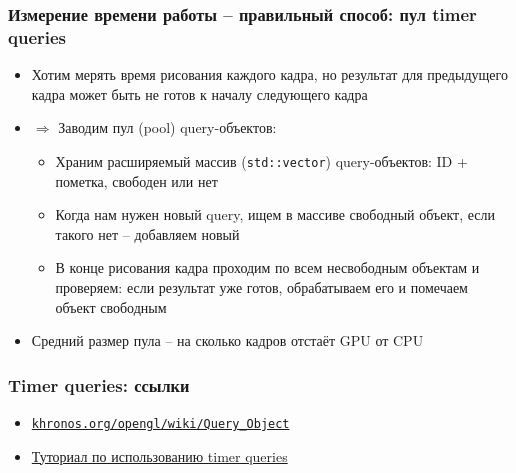 \documentclass{beamer}
\begin{document}
\begin{frame}[fragile]
\frametitle{Измерение времени работы -- правильный способ: пул timer queries}
\begin{itemize}
\item Хотим мерять время рисования каждого кадра, но результат для предыдущего кадра может быть не готов к началу следующего кадра
\pause
\item \begin{math}\Rightarrow\end{math} Заводим пул (pool) query-объектов:
\pause
\begin{itemize}
\item Храним расширяемый массив (\verb|std::vector|) query-объектов: ID + пометка, свободен или нет
\pause
\item Когда нам нужен новый query, ищем в массиве свободный объект, если такого нет -- добавляем новый
\pause
\item В конце рисования кадра проходим по всем несвободным объектам и проверяем: если результат уже готов, обрабатываем его и помечаем объект свободным
\end{itemize}
\pause
\item Средний размер пула -- на сколько кадров отстаёт GPU от CPU
\end{itemize}
\end{frame}

\begin{frame}[fragile]
\frametitle{Timer queries: ссылки}
\begin{itemize}
\item \href{https://www.khronos.org/opengl/wiki/Query_Object}{\nolinkurl{khronos.org/opengl/wiki/Query\_Object}}
\item \href{https://www.lighthouse3d.com/tutorials/opengl-timer-query}{Туториал по использованию timer queries}
\end{itemize}
\end{frame}
\end{document}
